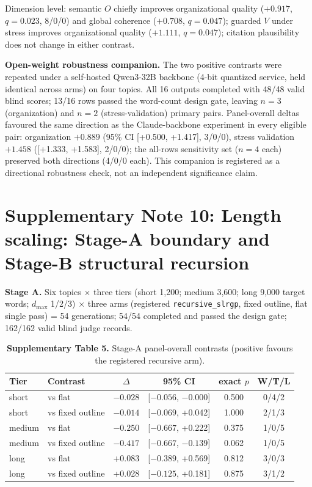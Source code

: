 \documentclass[11pt,a4paper]{article}
\newcommand{\snote}[1]{\section*{Supplementary Note #1}}
\begin{document}
Dimension level: semantic $O$ chiefly improves organizational quality ($+0.917$, $q=0.023$, 8/0/0) and global coherence ($+0.708$, $q=0.047$); guarded $V$ under stress improves organizational quality ($+1.111$, $q=0.047$); citation plausibility does not change in either contrast.

\textbf{Open-weight robustness companion.} The two positive contrasts were repeated under a self-hosted Qwen3-32B backbone (4-bit quantized service, held identical across arms) on four topics. All 16 outputs completed with 48/48 valid blind scores; 13/16 rows passed the word-count design gate, leaving $n=3$ (organization) and $n=2$ (stress-validation) primary pairs. Panel-overall deltas favoured the same direction as the Claude-backbone experiment in every eligible pair: organization $+0.889$ (95\% CI [+0.500, +1.417], 3/0/0), stress validation $+1.458$ ([+1.333, +1.583], 2/0/0); the all-rows sensitivity set ($n=4$ each) preserved both directions (4/0/0 each). This companion is registered as a directional robustness check, not an independent significance claim.

\snote{10: Length scaling: Stage-A boundary and Stage-B structural recursion}

\textbf{Stage A.} Six topics $\times$ three tiers (short 1,200; medium 3,600; long 9,000 target words; $d_{\max}$ 1/2/3) $\times$ three arms (registered \texttt{recursive\_slrgp}, fixed outline, flat single pass) = 54 generations; 54/54 completed and passed the design gate; 162/162 valid blind judge records.

\begin{table}[h]
\caption*{\textbf{Supplementary Table 5.} Stage-A panel-overall contrasts (positive favours the registered recursive arm).}
\centering
\small
\begin{tabular}{@{}llcccc@{}}
\toprule
Tier & Contrast & $\Delta$ & 95\% CI & exact $p$ & W/T/L \\
\midrule
short & vs flat & $-0.028$ & [$-0.056$, $-0.000$] & 0.500 & 0/4/2 \\
short & vs fixed outline & $-0.014$ & [$-0.069$, +0.042] & 1.000 & 2/1/3 \\
medium & vs flat & $-0.250$ & [$-0.667$, +0.222] & 0.375 & 1/0/5 \\
medium & vs fixed outline & $-0.417$ & [$-0.667$, $-0.139$] & 0.062 & 1/0/5 \\
long & vs flat & +0.083 & [$-0.389$, +0.569] & 0.812 & 3/0/3 \\
long & vs fixed outline & +0.028 & [$-0.125$, +0.181] & 0.875 & 3/1/2 \\
\bottomrule
\end{tabular}
\end{table}
\end{document}
